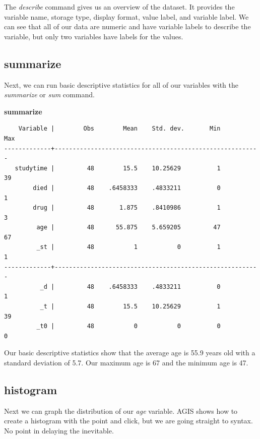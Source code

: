 \documentclass[
]{book}
\newenvironment{Shaded}{\begin{snugshade}}{\end{snugshade}}
\newcommand{\KeywordTok}[1]{\textcolor[rgb]{0.13,0.29,0.53}{\textbf{#1}}}
\begin{document}
The \emph{describe} command gives us an overview of the dataset. It provides the variable name, storage type, display format, value label, and variable label. We can see that all of our data are numeric and have variable labels to describe the variable, but only two variables have labels for the values.

\subsection{summarize}\label{summarize}

Next, we can run basic descriptive statistics for all of our variables with the \emph{summarize} or \emph{sum} command.

\begin{Shaded}
\begin{Highlighting}[]
\KeywordTok{summarize}
\end{Highlighting}
\end{Shaded}

\begin{verbatim}
    Variable |        Obs        Mean    Std. dev.       Min        Max
-------------+---------------------------------------------------------
   studytime |         48        15.5    10.25629          1         39
        died |         48    .6458333    .4833211          0          1
        drug |         48       1.875    .8410986          1          3
         age |         48      55.875    5.659205         47         67
         _st |         48           1           0          1          1
-------------+---------------------------------------------------------
          _d |         48    .6458333    .4833211          0          1
          _t |         48        15.5    10.25629          1         39
         _t0 |         48           0           0          0          0
\end{verbatim}

Our basic descriptive statistics show that the average age is 55.9 years old with a standard deviation of 5.7. Our maximum age is 67 and the minimum age is 47.

\subsection{histogram}\label{histogram}

Next we can graph the distribution of our \emph{age} variable. AGIS shows how to create a histogram with the point and click, but we are going straight to syntax. No point in delaying the inevitable.
\end{document}
